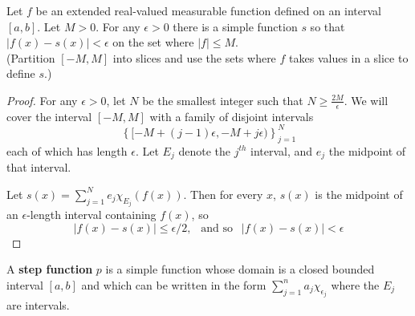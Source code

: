 \begin{pblm}\label{p:contalmostsimple}%
	Let $f$ be an extended real-valued measurable function defined on an 
	interval $[a,b]$. Let $M > 0$. For any $\epsilon > 0$ there is a simple 
	function $s$ so that $|f(x) - s(x)| < \epsilon$ on the set where $|f| 
	\le M$. \\ (Partition $[-M,M]$ into slices and use the sets where $f$ 
	takes values in a slice to define $s$.)
\begin{proof}
	For any $\epsilon > 0$, let $N$ be the smallest integer such that 
	$N \ge \frac{2M}{\epsilon}$. 
	We will cover the interval $[-M,M]$ with a family of disjoint intervals 
	\begin{equation*}
		\left\{[ -M+(j-1)\epsilon, -M + j\epsilon )\right\}_{j=1}^N
	\end{equation*} 
	each of which has length 
	$\epsilon$. Let $E_j$ denote the $j^{th}$ interval, and $e_j$ the midpoint of that 
	interval. 

	Let $s(x) = \sum\limits_{j=1}^N e_j\chi_{E_j}(f(x))$. Then for every $x$, 
	$s(x)$ is the midpoint of an $\epsilon$-length interval containing $f(x)$, so 
	\begin{equation*}
		|f(x) - s(x)| \le \epsilon/2,~~\text{ and so }~~|f(x) - s(x)| < \epsilon
	\end{equation*}
\end{proof}
\end{pblm}

\begin{defn}\label{d:stepfunction}%
	A \textbf{step function} $p$ is a simple function whose domain is a closed 
	bounded interval $[a,b]$ and which can be written in the form 
	$\sum_{j=1}^n a_j\chi_{\epsilon_j}$ where the $E_j$ are intervals. 
\end{defn}

